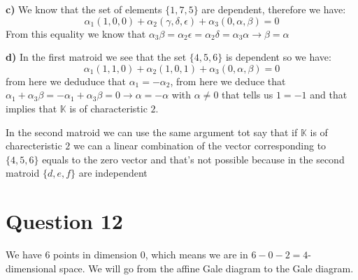 \documentclass[12pt]{article}
\begin{document}
\textbf{c)} We know that the set of elements $\{1,7,5\}$ are dependent, therefore we have:
$$
\alpha_{1}(1,0,0)+\alpha_{2}(\gamma,\delta,\epsilon)+\alpha_{3}(0,\alpha,\beta)=0
$$
From this equality we know that  $\alpha_{3}\beta=\alpha_{2}\epsilon=\alpha_{2}\delta=\alpha_{3}\alpha\rightarrow\beta=\alpha$

\textbf{d)} In the first matroid we see that the set $\{4,5,6\}$ is dependent so we have:
$$
\alpha_{1}(1,1,0)+\alpha_{2}(1,0,1)+\alpha_{3}(0,\alpha,\beta)=0
$$
from here we deduduce that $\alpha_{1}=-\alpha_{2}$, from here we deduce that $\alpha_{1}+\alpha_{3}\beta=-\alpha_{1}+\alpha_{3}\beta=0\rightarrow \alpha=-\alpha$ with $\alpha\neq 0$ that tells us $1=-1$ and that implies that $\mathbb{K}$ is of characteristic $2$.

In the second matroid we can use the same argument tot say that if $\mathbb{K}$ is of charecteristic $2$ we can a linear combination of the vector corresponding to $\{4,5,6\}$ equals to the zero vector and that's not possible because in the second matroid $\{d,e,f\}$ are independent

\section{Question 12}

We have 6 points in dimension 0, which means we are in $6-0-2=4$-dimensional space. We will go from the affine Gale diagram to the Gale diagram. 
\end{document}
